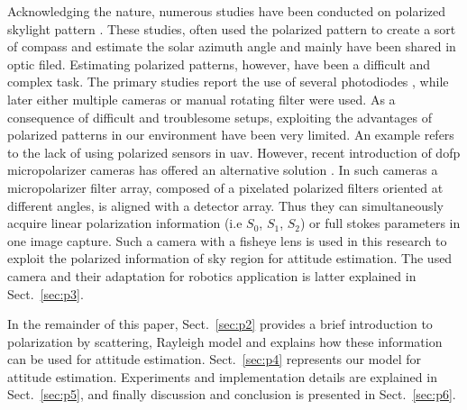 Acknowledging the nature, numerous studies have been conducted on polarized
skylight pattern \cite{lambrinos2000insectnavigation, chu2009application,
  zhao2009novel, wang2015novel,chahl2013integration, ashkanazy2015bio,
  sturzl2012fisheye, ma2015skylightpolarization,
  miyazaki09sunlightpolarization, wang2014bionic,
  lu2015angle,hamaoui2017polarized}.  These studies, often used the polarized
pattern to create a sort of compass and estimate the solar azimuth angle and
mainly have been shared in optic filed.  Estimating polarized patterns,
however, have been a difficult and complex task.  The primary studies report
the use of several photodiodes \cite{lambrinos2000insectnavigation,
  chu2009application, zhao2009novel, wang2015novel,chahl2013integration}, while
later either multiple cameras \cite{ashkanazy2015bio, sturzl2012fisheye,
  wang2014bionic} or manual rotating filter \cite{ma2015skylightpolarization,
  miyazaki09sunlightpolarization, lu2015angle, hamaoui2017polarized} were used.
As a consequence of difficult and troublesome setups, exploiting the advantages
of polarized patterns in our environment have been very limited. An example
refers to the lack of using polarized sensors in \gls{uav}.  However, recent
introduction of \gls{dofp} micropolarizer cameras has offered an alternative
solution \cite{nordin1999micropolarizer, nordin1999diffractive,
  millerd2006pixelated}.  In such cameras a micropolarizer filter array,
composed of a pixelated polarized filters oriented at different angles, is
aligned with a detector array. Thus they can simultaneously acquire linear
polarization information (i.e $S_0$, $S_1$, $S_2$) or full stokes parameters in
one image capture.
Such a camera with a fisheye lens is used in this research to exploit the
polarized information of sky region for attitude estimation.
The used camera and their adaptation for robotics application
is latter explained in Sect.~\ref{sec:p3}.

In the remainder of this paper, Sect.~\ref{sec:p2} provides a brief
introduction to polarization by scattering, Rayleigh model and explains how
these information can be used for attitude estimation. Sect.~\ref{sec:p4}
represents our model for attitude estimation. Experiments and implementation
details are explained in Sect.~\ref{sec:p5}, and finally discussion and
conclusion is presented in Sect.~\ref{sec:p6}.
























